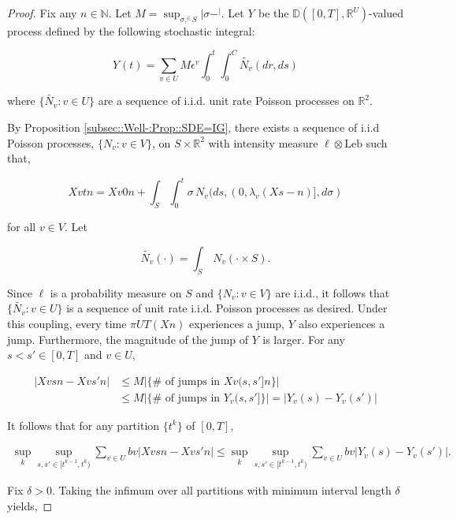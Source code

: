 \documentclass[12pt]{article}
\newcommand{\mb}{\mathbb}
\newcommand{\te}{\text}
\newcommand{\ep}{\epsilon}
\newcommand{\ind}{\hspace{24pt}}
\newcommand{\cad}{\mb{D}}							%
\renewcommand{\v}{v}							%
\renewcommand{\U}{U}							%
\renewcommand{\S}{S}							%
\newcommand{\s}{\sigma}							%
\renewcommand{\b}{b}							%
\newcommand{\ev}[1]{\ep^{#1}}					%
\newcommand{\T}{T}								%
\renewcommand{\t}{t}							%
\newcommand{\proj}{\pi}							%
\renewcommand{\tt}{s}							%
\newcommand{\ttt}{s'}							%
\newcommand{\X}{X}								%
\renewcommand{\ss}[1]{^{#1}}					%
\newcommand{\const}{C}							%
\newcommand{\sln}[1]{^{#1}}						%
\newcommand{\poiss}[1]{N_{#1}}						%
\newcommand{\leb}{\te{Leb}}							%
\renewcommand{\r}{r}								%
\renewcommand{\it}{k}								%
\newcommand{\rxvtt}[2]{Y_{#1}{(#2)}}				%
\newcommand{\rxvtts}[2]{Y_{#1}{#2}}					%
\newcommand{\rate}[1]{\lambda_{#1}}					%
\newcommand{\Sm}{\ell}								%
\newcommand{\alt}{\widetilde}						%
\begin{document}
\begin{proof}
Fix any \(n \in \mb{N}\). Let \(M = \sup_{\s,\ss \in \S} |\s - \ss|\). Let \(\rxvtts{}{}\) be the \(\cad([0,\T],\mb{R}^\U)\)-valued process defined by the following stochastic integral:

\[\rxvtt{}{\t} = \sum_{\v \in \U}M\ev{\v}\int_0^\t\int_0^{\const{}}\alt{\poiss{\v}}(d\r, d\tt)\]

where \(\{\alt{\poiss{\v}}:\v \in \U\}\) are a sequence of i.i.d. unit rate Poisson processes on \(\mb{R}^2\). 

\ind By Proposition \ref{subsec::Well-:Prop::SDE=IG}, there exists a sequence of i.i.d Poisson processes, \(\{\poiss{\v}:\v\in  V\}\), on \(\S\times\mb{R}^2\) with intensity measure \(\Sm\otimes \leb\) such that,

\[\X{\v}{\t}{n} = \X{\v}{0}{n} + \int_\S\int_0^\t \s\,\poiss{\v}(d\tt,(0,\rate{\v}(\X{}{\tt-}{n})],d\s)\]

for all \(\v\in  V\). Let

\[\alt{\poiss{\v}}(\cdot) = \int_\S\,\poiss{\v}(\cdot\times \S).\]

Since \(\Sm\) is a probability measure on \(\S\) and \(\{\poiss{\v}:\v\in  V\}\) are i.i.d., it follows that \(\{\alt{\poiss{\v}}:\v\in \U\}\) is a sequence of unit rate i.i.d. Poisson processes as desired. Under this coupling, every time \(\proj{\U}{\T}(\X{}{}{n})\) experiences a jump, \(\rxvtts{}{}\) also experiences a jump. Furthermore, the magnitude of the jump of \(\rxvtts{}{}\) is larger. For any \(\tt<\ttt\in [0,\T]\) and \(\v\in \U\),

\begin{align*}
|\X{\v}{\tt}{n} - \X{\v}{\ttt}{n}|&\leq M\left|\{\#\te{ of jumps in }\X{\v}{(\tt,\ttt]}{n}\}\right| \\
&\leq M\left|\{\#\te{ of jumps in }\rxvtts{\v}{(\tt,\ttt]}\}\right| = \left|\rxvtt{\v}{\tt} - \rxvtt{\v}{\ttt}\right|
\end{align*}

It follows that for any partition \(\{\t\sln{\it}\}\) of \([0,\T]\),

\begin{align*}
\sup_\it\sup_{\tt,\ttt \in [\t\sln{\it-1},\t\sln{\it})} \sum_{\v\in \U} \b{\v}|\X{\v}{\tt}{n} - \X{\v}{\ttt}{n}|\leq \sup_\it\sup_{\tt,\ttt \in [\t\sln{\it-1},\t\sln{\it})} \sum_{\v\in \U} \b{\v}|\rxvtt{\v}{\tt} - \rxvtt{\v}{\ttt}|.
\end{align*}

Fix \(\delta > 0\). Taking the infimum over all partitions with minimum interval length \(\delta\) yields,


\end{proof}
\end{document}
